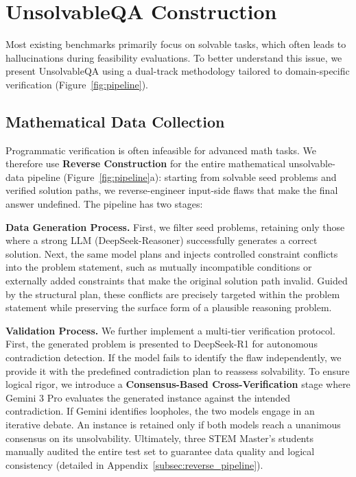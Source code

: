 \section{UnsolvableQA Construction}
\label{sec:dataset}

Most existing benchmarks primarily focus on solvable tasks, which often leads to hallucinations during feasibility evaluations. To better understand this issue,  we present UnsolvableQA using a dual-track methodology tailored to domain-specific verification (Figure~\ref{fig:pipeline}).

\subsection{Mathematical Data Collection}
\label{sec:math_gen}

Programmatic verification is often infeasible for advanced math tasks. We therefore use \textbf{Reverse Construction} for the entire mathematical unsolvable-data pipeline (Figure~\ref{fig:pipeline}a): starting from solvable seed problems and verified solution paths, we reverse-engineer input-side flaws that make the final answer undefined. The pipeline has two stages:

\vspace{0.3em}
\noindent\textbf{Data Generation Process.}
First, we filter seed problems, retaining only those where a strong LLM (DeepSeek-Reasoner) successfully generates a correct solution. Next, the same model plans and injects controlled constraint conflicts into the problem statement, such as mutually incompatible conditions or externally added constraints that make the original solution path invalid. Guided by the structural plan, these conflicts are precisely targeted within the problem statement while preserving the surface form of a plausible reasoning problem.

\vspace{0.3em}
\noindent\textbf{Validation Process.}
We further implement a multi-tier verification protocol. First, the generated problem is presented to DeepSeek-R1 for autonomous contradiction detection. If the model fails to identify the flaw independently, we provide it with the predefined contradiction plan to reassess solvability.
To ensure logical rigor, we introduce a \textbf{Consensus-Based Cross-Verification} stage where Gemini 3 Pro evaluates the generated instance against the intended contradiction. If Gemini identifies loopholes, the two models engage in an iterative debate. An instance is retained only if both models reach a unanimous consensus on its unsolvability. Ultimately, three STEM Master's students manually audited the entire test set to guarantee data quality and logical consistency (detailed in Appendix~\ref{subsec:reverse_pipeline}).




